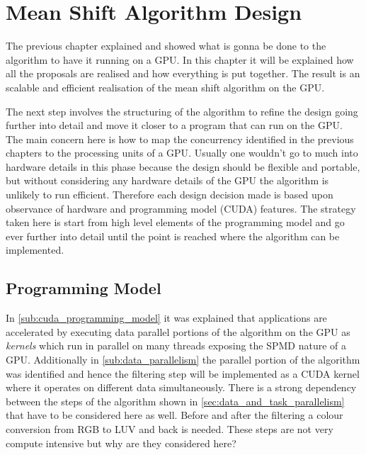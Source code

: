 
\chapter{Mean Shift Algorithm Design} %
\label{cha:algorithm_design}
The previous chapter explained and showed what is gonna be done to the algorithm
to have it running on a \gls{GPU}. In this chapter it will be explained how all
the proposals are realised and how everything is put together. The result is an
scalable and efficient realisation of the mean shift algorithm on the \gls{GPU}.

The next step involves the structuring of the algorithm to refine the design
going further into detail and move it closer to a program that can run on the
\gls{GPU}. The main concern here is how to map the concurrency identified in the
previous chapters to the processing units of a \gls{GPU}. Usually one wouldn't
go to much into hardware details in this phase because the design should be
flexible and portable, but without considering any hardware details of the
\gls{GPU} the algorithm is unlikely to run efficient. Therefore each design
decision made is based upon observance of hardware and programming model
(\gls{CUDA}) features. The strategy taken here is start from high level elements
of the programming model and go ever further into detail until the point is reached
where the algorithm can be implemented. 

\section{Programming Model} %
\label{sec:cuda_kernels}

In \autoref{sub:cuda_programming_model} it was explained that applications are
accelerated by executing data parallel portions of the algorithm on the
\gls{GPU} as \emph{kernels} which run in parallel on many threads exposing the
\gls{SPMD} nature of a \gls{GPU}. Additionally in \autoref{sub:data_parallelism}
the parallel portion of the algorithm was identified and hence the filtering
step will be implemented as a \gls{CUDA} kernel where it operates on different
data simultaneously. There is a strong dependency between the steps of the 
algorithm shown in \autoref{sec:data_and_task_parallelism} that have to be 
considered here as well. Before and after the filtering a colour conversion from
\gls{RGB} to \gls{LUV} and back is needed. These steps are not very compute 
intensive but why are they considered here?

